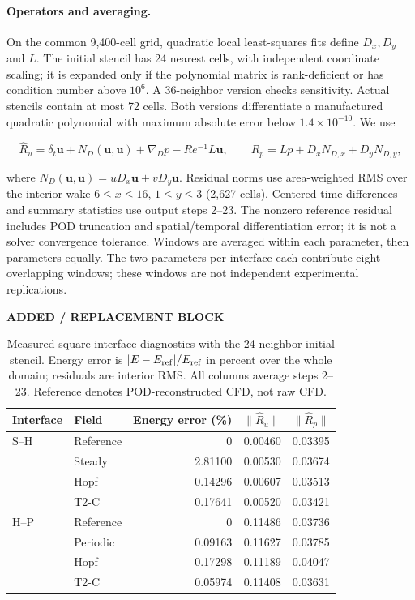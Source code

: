 \documentclass{article}
\providecommand{\DIFaddtex}[1]{{\protect\color{blue} \sf #1}} %
\providecommand{\DIFadd}[1]{\texorpdfstring{\DIFaddtex{#1}}{#1}} %
\begin{document}
\paragraph{\DIFadd{Operators and averaging.}}
\DIFadd{On the common 9,400-cell grid, quadratic local least-squares fits define
$D_x,D_y$ and $L$. The initial stencil has 24 nearest cells, with independent
coordinate scaling; it is expanded only if the polynomial matrix is
rank-deficient or has condition number above $10^6$. A 36-neighbor version
checks sensitivity. Actual stencils contain at most 72 cells. Both versions
differentiate a manufactured quadratic polynomial with maximum absolute
error below $1.4\times10^{-10}$. We use
}



{\color{blue}
\begin{equation}
\widehat R_u=\delta_t\bm u+N_D(\bm u,\bm u)+\nabla_Dp-Re^{-1}L\bm u,
\qquad
\widehat R_p=Lp+D_xN_{D,x}+D_yN_{D,y},
\end{equation}
}



\DIFadd{where $N_D(\bm u,\bm u)=uD_x\bm u+vD_y\bm u$.
Residual norms use area-weighted RMS over the interior wake
$6\leq x\leq16$, $1\leq y\leq3$ (2,627 cells).
Centered time differences and summary statistics use output steps 2--23.
The nonzero reference residual includes POD truncation and spatial/temporal
differentiation error; it is not a solver convergence tolerance. Windows
are averaged within each parameter, then parameters equally. The two
parameters per interface each contribute eight overlapping windows;
these windows are not independent experimental replications.
}




{\color{blue}
\begin{table}[H]
\color{blue}\noindent\textbf{ADDED / REPLACEMENT BLOCK}\par
\centering\small
\caption{Measured square-interface diagnostics with the 24-neighbor initial
stencil. Energy error is $|E-E_{\rm ref}|/E_{\rm ref}$ in percent over the
whole domain; residuals are interior RMS. All columns average steps 2--23.
Reference denotes POD-reconstructed CFD, not raw CFD.}
\label{tab:fusion_residual_measured}
\begin{tabular}{@{}llrrr@{}}
\toprule
Interface & Field & Energy error (\%) & $\|\widehat R_u\|$ & $\|\widehat R_p\|$\\
\midrule
S--H & Reference & 0 & 0.00460 & 0.03395\\
& Steady & 2.81100 & 0.00530 & 0.03674\\
& Hopf & 0.14296 & 0.00607 & 0.03513\\
& T2-C & 0.17641 & 0.00520 & 0.03421\\
\midrule
H--P & Reference & 0 & 0.11486 & 0.03736\\
& Periodic & 0.09163 & 0.11627 & 0.03785\\
& Hopf & 0.17298 & 0.11189 & 0.04047\\
& T2-C & 0.05974 & 0.11408 & 0.03631\\
\bottomrule
\end{tabular}
\end{table}
}
\end{document}
